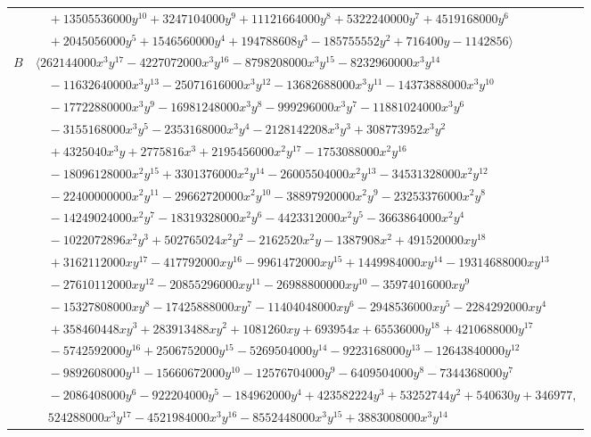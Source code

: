 \documentclass[11pt]{article}
\begin{document}
\begin{longtable}{@{}ll@{}}
 & $\quad +13505536000y^{10}+3247104000y^{9}+11121664000y^{8}+5322240000y^{7}+4519168000y^{6}$\\
 & $\quad +2045056000y^{5}+1546560000y^{4}+194788608y^{3}-185755552y^{2}+716400y-1142856\rangle$\\
$B$ & $\langle 262144000x^{3}y^{17}-4227072000x^{3}y^{16}-8798208000x^{3}y^{15}-8232960000x^{3}y^{14}$\\
 & $\quad -11632640000x^{3}y^{13}-25071616000x^{3}y^{12}-13682688000x^{3}y^{11}-14373888000x^{3}y^{10}$\\
 & $\quad -17722880000x^{3}y^{9}-16981248000x^{3}y^{8}-999296000x^{3}y^{7}-11881024000x^{3}y^{6}$\\
 & $\quad -3155168000x^{3}y^{5}-2353168000x^{3}y^{4}-2128142208x^{3}y^{3}+308773952x^{3}y^{2}$\\
 & $\quad +4325040x^{3}y+2775816x^{3}+2195456000x^{2}y^{17}-1753088000x^{2}y^{16}$\\
 & $\quad -18096128000x^{2}y^{15}+3301376000x^{2}y^{14}-26005504000x^{2}y^{13}-34531328000x^{2}y^{12}$\\
 & $\quad -22400000000x^{2}y^{11}-29662720000x^{2}y^{10}-38897920000x^{2}y^{9}-23253376000x^{2}y^{8}$\\
 & $\quad -14249024000x^{2}y^{7}-18319328000x^{2}y^{6}-4423312000x^{2}y^{5}-3663864000x^{2}y^{4}$\\
 & $\quad -1022072896x^{2}y^{3}+502765024x^{2}y^{2}-2162520x^{2}y-1387908x^{2}+491520000xy^{18}$\\
 & $\quad +3162112000xy^{17}-417792000xy^{16}-9961472000xy^{15}+1449984000xy^{14}-19314688000xy^{13}$\\
 & $\quad -27610112000xy^{12}-20855296000xy^{11}-26988800000xy^{10}-35974016000xy^{9}$\\
 & $\quad -15327808000xy^{8}-17425888000xy^{7}-11404048000xy^{6}-2948536000xy^{5}-2284292000xy^{4}$\\
 & $\quad +358460448xy^{3}+283913488xy^{2}+1081260xy+693954x+65536000y^{18}+4210688000y^{17}$\\
 & $\quad -5742592000y^{16}+2506752000y^{15}-5269504000y^{14}-9223168000y^{13}-12643840000y^{12}$\\
 & $\quad -9892608000y^{11}-15660672000y^{10}-12576704000y^{9}-6409504000y^{8}-7344368000y^{7}$\\
 & $\quad -2086408000y^{6}-922204000y^{5}-184962000y^{4}+423582224y^{3}+53252744y^{2}+540630y+346977,$\\
 & $\quad 524288000x^{3}y^{17}-4521984000x^{3}y^{16}-8552448000x^{3}y^{15}+3883008000x^{3}y^{14}$\\

\end{longtable}
\end{document}
